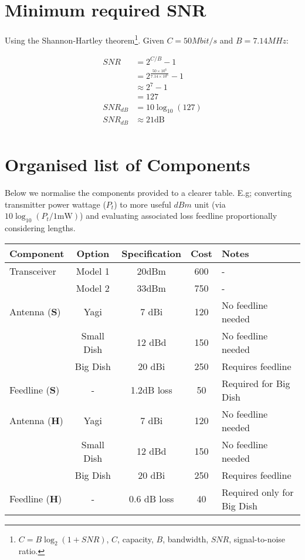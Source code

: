 \documentclass{article}
\begin{document}
\newpage

\section*{Minimum required SNR}
Using the Shannon-Hartley theorem\footnote{$C = B \log_2 (1 + SNR)$, $C$, capacity, $B$, bandwidth, $SNR$, signal-to-noise ratio.}. Given $C = 50Mbit/s$ and $B = 7.14MHz$:

\begin{align*}
								SNR &= 2^{C/B} - 1 \\
										&= 2^{\frac{50 \times 10^6}{7.14 \times 10^6}} - 1 \\
										&\approx 2^7 - 1 \\
										&= 127 \\
				   SNR_{dB} &= 10 \log_{10}(127) \\
				   SNR_{dB} &\approx 21\text{dB} \\
\end{align*}

\section*{Organised list of Components}
Below we normalise the components provided to a clearer table. E.g; converting transmitter power wattage ($P_t$) to more useful $dBm$ unit (via $10 \log_{10}(P_t/1 \text{mW})$) and evaluating associated loss feedline proportionally considering lengths.

\begin{table}[h]
    \centering
    \begin{tabular}{lcccl}
        \toprule
        Component & Option & Specification & Cost & Notes \\
        \midrule
        Transceiver & Model 1 & 20dBm & 600 & - \\
                    & Model 2 & 33dBm & 750 & - \\
        \midrule
        Antenna ($\boldsymbol{S}$) & Yagi & 7 dBi & 120 & No feedline needed \\
                            & Small Dish & 12 dBd & 150 & No feedline needed \\
                            & Big Dish & 20 dBi & 250 & Requires feedline \\
				Feedline ($\boldsymbol{S}$) & - & 1.2dB loss & 50 & Required for Big Dish \\
        \midrule
        Antenna ($\boldsymbol{H}$) & Yagi & 7 dBi & 120 & No feedline needed \\
                       & Small Dish & 12 dBd & 150 & No feedline needed \\
                       & Big Dish & 20 dBi & 250 & Requires feedline \\
        Feedline ($\boldsymbol{H}$) & - & 0.6 dB loss & 40 & Required only for Big Dish \\
        \bottomrule
    \end{tabular}
\end{table}
\end{document}
